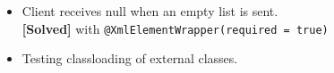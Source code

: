 \begin{itemize}
    \item Client receives null when an empty list is sent.\\
      \textbf{[Solved]} with \verb|@XmlElementWrapper(required = true)|
    \item Testing classloading of external classes.
\end{itemize}